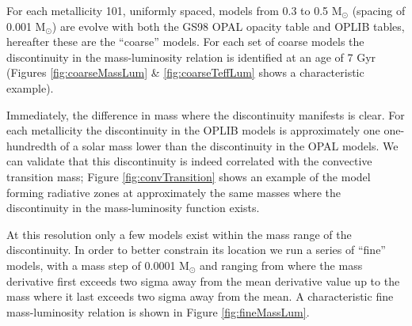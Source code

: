 For each metallicity 101, uniformly spaced, models from 0.3 to 0.5 M$_{\odot}$
(spacing of 0.001 M$_{\odot}$) are evolve with both the GS98 OPAL opacity table
and OPLIB tables, hereafter these are the ``coarse'' models. For each set of
coarse models the discontinuity in the mass-luminosity relation is identified
at an age of 7 Gyr (Figures \ref{fig:coarseMassLum} \& \ref{fig:coarseTeffLum}
shows a characteristic example).


Immediately, the difference in mass where the discontinuity manifests is clear.
For each metallicity the discontinuity in the OPLIB models is approximately one
one-hundredth of a solar mass lower than the discontinuity in the OPAL models. We can
validate that this discontinuity is indeed correlated with the convective
transition mass; Figure \ref{fig:convTransition} shows an example of the model
forming radiative zones at approximately the same masses where the discontinuity
in the mass-luminosity function exists.

At this resolution only a few models exist within the
mass range of the discontinuity. In order to better constrain its location we
run a series of ``fine'' models, with a mass step of 0.0001 M$_{\odot}$ and
ranging from where the mass derivative first exceeds two sigma away from the
mean derivative value up to the mass where it last exceeds two sigma away from
the mean. A characteristic fine mass-luminosity relation is shown in Figure
\ref{fig:fineMassLum}.


